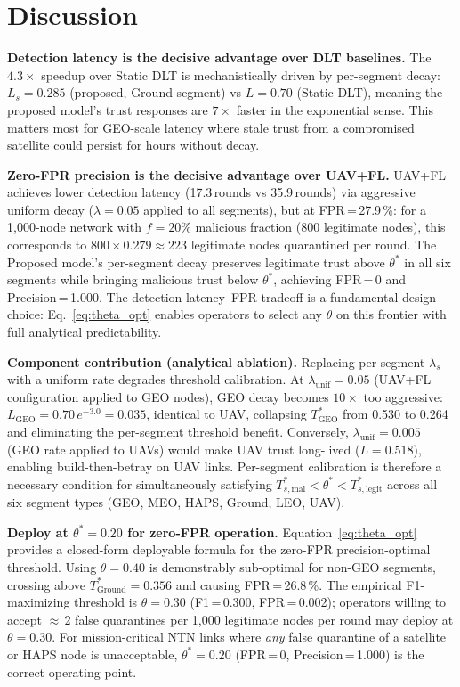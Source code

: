 \documentclass[journal,twoside,10pt]{IEEEtran}
\begin{document}
\section{Discussion}
\label{sec:discussion}

\textbf{Detection latency is the decisive advantage over DLT baselines.}
The $4.3\times$ speedup over Static DLT is mechanistically driven by
per-segment decay: $L_s\!=\!0.285$ (proposed, Ground segment) vs
$L\!=\!0.70$ (Static DLT), meaning the proposed model's trust
responses are $7\times$ faster in the exponential sense.
This matters most for GEO-scale latency where stale trust from a
compromised satellite could persist for hours without decay.

\textbf{Zero-FPR precision is the decisive advantage over UAV+FL.}
UAV+FL achieves lower detection latency (17.3\,rounds vs 35.9\,rounds)
via aggressive uniform decay ($\lambda\!=\!0.05$ applied to all
segments), but at FPR\,=\,27.9\,\%: for a 1{,}000-node network with
$f\!=\!20\%$ malicious fraction (800 legitimate nodes),
this corresponds to $800\!\times\!0.279\!\approx\!223$ legitimate
nodes quarantined per round.
The Proposed model's per-segment decay preserves legitimate trust above
$\theta^*$ in all six segments while bringing malicious trust below
$\theta^*$, achieving FPR\,=\,0 and Precision\,=\,1.000.
The detection latency--FPR tradeoff is a fundamental design choice:
Eq.~\eqref{eq:theta_opt} enables operators to select any $\theta$
on this frontier with full analytical predictability.

\textbf{Component contribution (analytical ablation).}
Replacing per-segment $\lambda_s$ with a uniform rate degrades
threshold calibration.
At $\lambda_{\mathrm{unif}}\!=\!0.05$ (UAV+FL configuration applied
to GEO nodes), GEO decay becomes $10\times$ too aggressive:
$L_{\mathrm{GEO}}\!=\!0.70\,e^{-3.0}\!=\!0.035$, identical to UAV,
collapsing $T^*_{\mathrm{GEO}}$ from 0.530 to 0.264 and eliminating
the per-segment threshold benefit.
Conversely, $\lambda_{\mathrm{unif}}\!=\!0.005$ (GEO rate applied to
UAVs) would make UAV trust long-lived ($L\!=\!0.518$), enabling
build-then-betray on UAV links.
Per-segment calibration is therefore a necessary condition for
simultaneously satisfying
$T^*_{s,\mathrm{mal}} < \theta^* < T^*_{s,\mathrm{legit}}$ across all
six segment types (GEO, MEO, HAPS, Ground, LEO, UAV).

\textbf{Deploy at $\theta^*\!=\!0.20$ for zero-FPR operation.}
Equation~\eqref{eq:theta_opt} provides a closed-form deployable formula
for the zero-FPR precision-optimal threshold.
Using $\theta\!=\!0.40$ is demonstrably sub-optimal for non-GEO
segments, crossing above $T^*_{\mathrm{Ground}}\!=\!0.356$ and causing
FPR\,=\,26.8\,\%.
The empirical F1-maximizing threshold is $\theta\!=\!0.30$
(F1\,=\,0.300, FPR\,=\,0.002); operators willing to accept
$\approx$\,2 false quarantines per 1{,}000 legitimate nodes per round
may deploy at $\theta\!=\!0.30$.
For mission-critical NTN links where \emph{any} false quarantine
of a satellite or HAPS node is unacceptable, $\theta^*\!=\!0.20$
(FPR\,=\,0, Precision\,=\,1.000) is the correct operating point.
\end{document}
